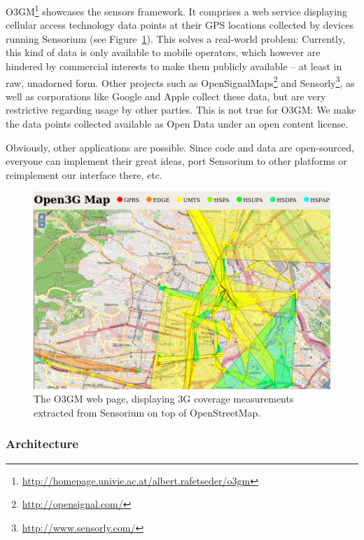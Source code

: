 O3GM\footnote{\url{http://homepage.univie.ac.at/albert.rafetseder/o3gm}} showcases the sensors framework. It comprises a web service displaying cellular access technology data points at their GPS locations collected by devices running Sensorium (see Figure~\ref{c5:fig:ogggm}). This solves a real-world problem: Currently, this kind of data is only available to mobile operators, which however  are hindered by commercial interests to make them publicly available -- at least in raw, unadorned form. Other projects such as OpenSignalMaps\footnote{\url{http://opensignal.com/}} and Sensorly\footnote{\url{http://www.sensorly.com/}}, as well as corporations like Google and Apple collect these data, but are very restrictive regarding usage by other parties. This is not true for O3GM: We make the data points collected available as Open Data under an open content license.

Obviously, other applications are possible. Since code and data are open-sourced, everyone can implement their great ideas, port Sensorium to other platforms or reimplement our interface there, etc.

\begin{figure}[htbp]
\centering
\includegraphics[width=.98\columnwidth]{images/map-cells.png}
\caption{\small The O3GM web page, displaying 3G coverage measurements extracted from Sensorium on top of OpenStreetMap.}
\label{c5:fig:ogggm}
\end{figure}

\subsubsection{Architecture}

